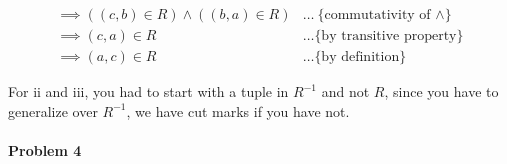 \documentclass[12pt]{scrartcl}
\begin{document}
\begin{enumerate}[a.]
\begin{enumerate}[i.]
\begin{align*}
        \\ \implies ((c,b) \in R) \land ((b,a) \in R)  & \ldots \text{\{ commutativity of $\land$\}}
        \\ \implies  (c,a) \in R  & \ldots \text{\{ by transitive property\}}
        \\ \implies (a,c) \in R & \ldots \text{\{ by definition\}}
    \end{align*}    
\end{enumerate}
For ii and iii, you had to start with a tuple in $R^{-1}$ and not $R$, since you have to generalize over $R^{-1}$, we have cut marks if you have not.
\end{enumerate}


\paragraph*{Problem 4}
\end{document}
